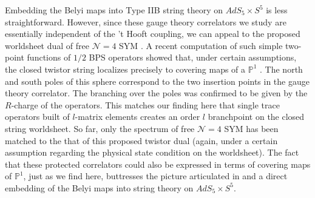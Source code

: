 \documentclass[english]{article}
\renewcommand{\>}{\rangle}
\newcommand{\<}{\langle}
\renewcommand{\(}{\left(}
\renewcommand{\)}{\right)}
\begin{document}
 Embedding the Belyi maps into Type IIB string theory on $AdS_{5} \times S^5$ is less straightforward. However, since these gauge theory correlators we study are essentially independent of the 't Hooft coupling, we can appeal to the proposed worldsheet dual of free $\mathcal{N}=4$ SYM \cite{gaberdiel2021string, gaberdiel2021worldsheet}. A recent computation of such simple two-point functions of $1/2$ BPS operators showed that, under certain assumptions, the closed twistor string localizes precisely to covering maps of a $\mathbb{P}^{1}$ \cite{Bhat:2021dez}. The north and south poles of this sphere correspond to the two insertion points in the gauge theory correlator. The branching over the poles was confirmed to be given by the $R$-charge of the operators. This matches our finding here that single trace operators built of $l$-matrix elements creates an order $l$ branchpoint on the closed string worldsheet. So far, only the spectrum of free $\mathcal{N}=4$ SYM has been matched to the that of this proposed twistor dual (again, under a certain assumption regarding the physical state condition on the worldsheet). The fact that these protected correlators could also be expressed in terms of covering maps of $\mathbb{P}^1$, just as we find here, buttresses the picture articulated in \cite{Bhat:2021dez} and a direct embedding of the Belyi maps into string theory on $AdS_{5} \times S^{5}$.   
\end{document}
